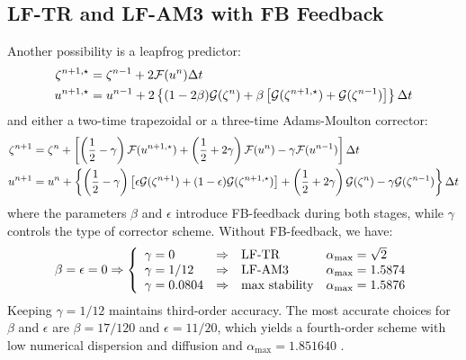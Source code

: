 \subsection{LF-TR and LF-AM3 with FB Feedback}
Another possibility is a leapfrog predictor:
\begin{equation}\begin{split}
   \zeta^{n+1,\star} &= \zeta^{n-1} + 2{\cal F}(u^n) \Delta t \\
   u^{n+1,\star} &= u^{n-1} + 2\left\{ (1-2\beta){\cal G}(\zeta^n)
   + \beta \left[{\cal G}(\zeta^{n+1,\star}) + {\cal G}(\zeta^{n-1}) \right]
   \right\} \Delta t
\end{split}\end{equation}
and either a two-time trapezoidal or a three-time Adams-Moulton corrector:
\begin{equation}\begin{split}
   \zeta^{n+1} &= \zeta^n + \left[ \left( \frac{1}{2}-\gamma \right)
   {\cal F}(u^{n+1,\star}) + \left( \frac{1}{2}+ 2\gamma \right) {\cal F}(u^n) -
   \gamma {\cal F}(u^{n-1}) \right] \Delta t \\
   u^{n+1} &= u^n + \left\{ \left( \frac{1}{2}-\gamma \right) \left[
   \epsilon {\cal G}(\zeta^{n+1}) +
   (1-\epsilon){\cal G}(\zeta^{n+1,\star}) \right] +
   \left( \frac{1}{2} + 2\gamma \right) {\cal G}(\zeta^n) - \gamma  {\cal
   G}(\zeta^{n-1}) \right\} \Delta t
\end{split}\end{equation}
where the parameters $\beta$ and $\epsilon$ introduce FB-feedback
during both stages, while $\gamma$ controls the type of corrector
scheme. Without FB-feedback, we have:
$$
   \beta = \epsilon = 0 \Rightarrow \left\{ \begin{array}
   { l @{\quad \Rightarrow \quad}l l}
   \gamma = 0 & \hbox{LF-TR} & \alpha_{\max} = \sqrt{2} \\
   \gamma = 1/12 & \hbox{LF-AM3} & \alpha_{\max} = 1.5874 \\
   \gamma = 0.0804 & \hbox{max stability} & \alpha_{\max}
   = 1.5876
   \end{array} \right.
$$
Keeping $\gamma = 1/12$ maintains third-order accuracy. The most
accurate choices for $\beta$ and $\epsilon$ are $\beta = 17/120$ and
$\epsilon = 11/20$, which yields a fourth-order scheme with low
numerical dispersion and diffusion and $\alpha_{\max} =
1.851640$ \citep{SS2008b}.

